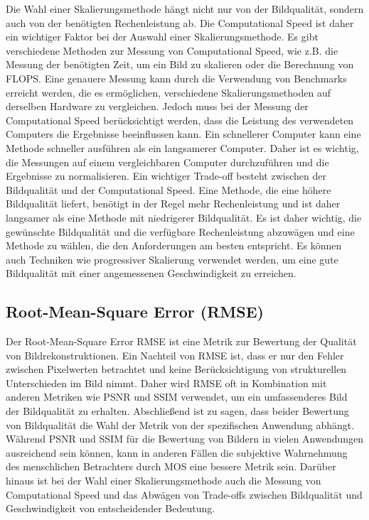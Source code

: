         Die Wahl einer Skalierungsmethode hängt nicht nur von der Bildqualität, sondern auch von der benötigten Rechenleistung ab. 
        Die Computational Speed ist daher ein wichtiger Faktor bei der Auswahl einer Skalierungsmethode.
        Es gibt verschiedene Methoden zur Messung von Computational Speed, wie z.B. die Messung der benötigten Zeit, um ein Bild zu skalieren oder die Berechnung von \ac{FLOPS}. 
        Eine genauere Messung kann durch die Verwendung von Benchmarks erreicht werden, die es ermöglichen, verschiedene Skalierungsmethoden auf derselben Hardware zu vergleichen.
        Jedoch muss bei der Messung der Computational Speed berücksichtigt werden, dass die Leistung des verwendeten Computers die Ergebnisse beeinflussen kann. 
        Ein schnellerer Computer kann eine Methode schneller ausführen als ein langsamerer Computer. 
        Daher ist es wichtig, die Messungen auf einem vergleichbaren Computer durchzuführen und die Ergebnisse zu normalisieren.
        Ein wichtiger Trade-off besteht zwischen der Bildqualität und der Computational Speed. 
        Eine Methode, die eine höhere Bildqualität liefert, benötigt in der Regel mehr Rechenleistung und ist daher langsamer als eine Methode mit niedrigerer Bildqualität. 
        Es ist daher wichtig, die gewünschte Bildqualität und die verfügbare Rechenleistung abzuwägen und eine Methode zu wählen, die den Anforderungen am besten entspricht. 
        Es können auch Techniken wie progressiver Skalierung verwendet werden, um eine gute Bildqualität mit einer angemessenen Geschwindigkeit zu erreichen.
        
    \subsection{Root-Mean-Square Error (RMSE)}
    
        Der Root-Mean-Square Error \ac{RMSE} ist eine Metrik zur Bewertung der Qualität von Bildrekonstruktionen. 
        Ein Nachteil von RMSE ist, dass er nur den Fehler zwischen Pixelwerten betrachtet und keine Berücksichtigung von strukturellen Unterschieden im Bild nimmt. 
        Daher wird RMSE oft in Kombination mit anderen Metriken wie \ac{PSNR} und \ac{SSIM} verwendet, um ein umfassenderes Bild der Bildqualität zu erhalten.
        Abschließend ist zu sagen, dass beider Bewertung von Bildqualität die Wahl der Metrik von der spezifischen Anwendung abhängt. 
        Während \ac{PSNR} und \ac{SSIM} für die Bewertung von Bildern in vielen Anwendungen ausreichend sein können, kann in anderen Fällen die subjektive Wahrnehmung des menschlichen Betrachters durch MOS eine bessere Metrik sein. 
        Darüber hinaus ist bei der Wahl einer Skalierungsmethode auch die Messung von Computational Speed und das Abwägen von Trade-offs zwischen Bildqualität und Geschwindigkeit von entscheidender Bedeutung.
        
